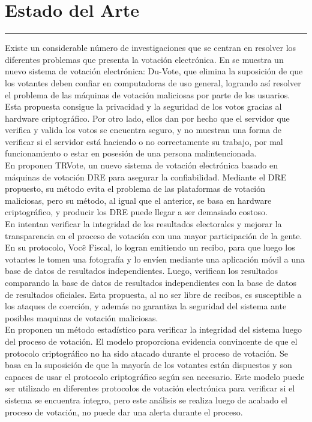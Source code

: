 \chapter{Estado del Arte}\label{background}
\hrule \bigskip \vspace*{1cm}

Existe un considerable número de investigaciones que se centran en resolver los diferentes problemas que presenta la votación electrónica. En \cite{grewal2015vote} se muestra un nuevo sistema de votación electrónica: Du-Vote, que elimina la suposición de que los votantes deben confiar en computadoras de uso general, logrando así resolver el problema de las máquinas de votación maliciosas por parte de los usuarios. Esta propuesta consigue la privacidad y la seguridad de los votos gracias al hardware criptográfico. Por otro lado, ellos dan por hecho que el servidor que verifica y valida los votos se encuentra seguro, y no muestran una forma de verificar si el servidor está haciendo o no correctamente su trabajo, por mal funcionamiento o estar en posesión de una persona malintencionada. \\
En \cite{tiryakioglu2016trvote} proponen TRVote, un nuevo sistema de votación electrónica basado en máquinas de votación DRE para asegurar la confiabilidad. Mediante el DRE propuesto, su método evita el problema de las plataformas de votación maliciosas, pero su método, al igual que el anterior, se basa en hardware criptográfico, y producir los DRE puede llegar a ser demasiado costoso. \\
En \cite{aranha2016crowdsourced} intentan verificar la integridad de los resultados electorales y mejorar la transparencia en el proceso de votación con una mayor participación de la gente. En su protocolo, Voc$\hat{e}$ Fiscal, lo logran emitiendo un recibo, para que luego los votantes le tomen una fotografía y lo envíen mediante una aplicación móvil a una base de datos de resultados independientes. Luego, verifican los resultados comparando la base de datos de resultados independientes con la base de datos de resultados oficiales. Esta propuesta, al no ser libre de recibos, es susceptible a los ataques de coerción, y además no garantiza la seguridad del sistema ante posibles maquinas de votación maliciosas. \\ 
En \cite{gjosteen2016experiment} proponen un método estadístico para verificar la integridad del sistema luego del proceso de votación. El modelo proporciona evidencia convincente de que el protocolo criptográfico no ha sido atacado durante el proceso de votación. Se basa en la suposición de que la mayoría de los votantes están dispuestos y son capaces de usar el protocolo criptográfico según sea necesario. Este modelo puede ser utilizado en diferentes protocolos de votación electrónica para verificar si el sistema se encuentra íntegro, pero este análisis se realiza luego de acabado el proceso de votación, no puede dar una alerta durante el proceso. \\

